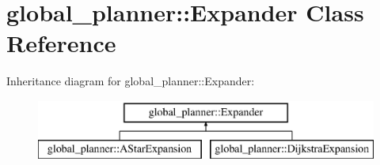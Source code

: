 \hypertarget{classglobal__planner_1_1_expander}{}\section{global\+\_\+planner\+:\+:Expander Class Reference}
\label{classglobal__planner_1_1_expander}
Inheritance diagram for global\+\_\+planner\+:\+:Expander\+:\begin{figure}[H]
\begin{center}
\leavevmode
\includegraphics[height=2.000000cm]{classglobal__planner_1_1_expander}
\end{center}
\end{figure}
